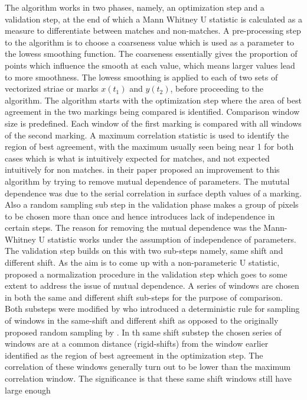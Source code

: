 \documentclass[12pt]{article}
\begin{document}
The algorithm works in two phases, namely, an optimization step and a
validation step, at the end of which a Mann Whitney U statistic is
calculated as a measure to differentiate between matches and
non-matches. A pre-processing step to the algorithm is to choose a
coarseness value which is used as a parameter to the lowess smoothing
function. The coarseness essentially gives the proportion of points
which influence the smooth at each value, which means larger values lead
to more smoothness. The lowess smoothing is applied to each of two sets
of vectorized striae or marks \(x(t_1)\) and \(y(t_2)\), before
proceeding to the algorithm. The algorithm starts with the optimization
step where the area of best agreement in the two markings being compared
is identified. Comparison window size is predefined. Each window of the
first marking is compared with all windows of the second marking. A
maximum correlation statistic is used to identify the region of best
agreement, with the maximum usually seen being near 1 for both cases
which is what is intuitively expected for matches, and not expected
intuitively for non matches. \citet{hadler} in their paper proposed an
improvement to this algorithm by trying to remove mutual dependence of
parameters. The mututal dependence was due to the serial correlation in
surface depth values of a marking. Also a random sampling sub step in
the validation phase makes a group of pixels to be chosen more than once
and hence introduces lack of independence in certain steps. The reason
for removing the mutual dependence was the Mann-Whitney U statistic
works under the assumption of independence of parameters. The validation
step builds on this with two sub-steps namely, same shift and different
shift. As the aim is to come up with a non-parameteric U statistic,
\citet{hadler} proposed a normalization procedure in the validation step
which goes to some extent to address the issue of mutual dependence. A
series of windows are chosen in both the same and different shift
sub-steps for the purpose of comparison. Both substeps were modified by
\citet{hadler} who introduced a deterministic rule for sampling of
windows in the same-shift and different shift as opposed to the
originally proposed random sampling by \citet{chumbley}. In th same
shift substep the chosen series of windows are at a common distance
(rigid-shifts) from the window earlier identified as the region of best
agreement in the optimization step. The correlation of these windows
generally turn out to be lower than the maximum correlation window. The
significance is that these same shift windows still have large enough
\end{document}
